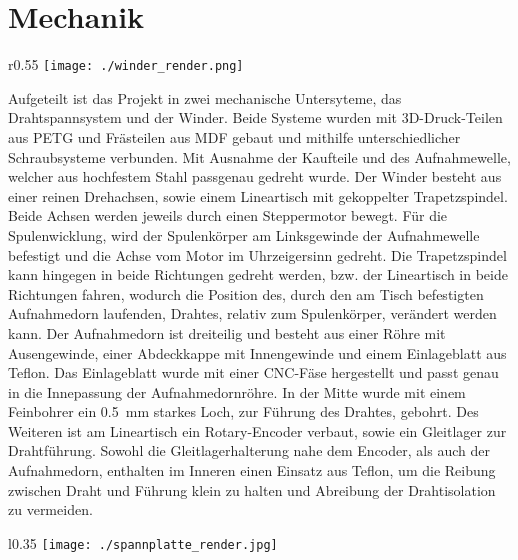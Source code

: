 \section{Mechanik}
\label{sec:Mechanik}




\begin{wrapfigure}{r}{0.55\textwidth}
    \centering
    \texttt{[image: ./winder\_render.png]}
\end{wrapfigure}

Aufgeteilt ist das Projekt in zwei mechanische Untersyteme, das Drahtspannsystem und der Winder.
Beide Systeme wurden mit 3D-Druck-Teilen aus PETG und Frästeilen aus MDF gebaut und mithilfe unterschiedlicher Schraubsysteme verbunden. Mit Ausnahme der Kaufteile und des Aufnahmewelle, welcher aus hochfestem Stahl passgenau gedreht wurde.
\newline
Der Winder besteht aus einer reinen Drehachsen, sowie einem Lineartisch mit gekoppelter Trapetzspindel. Beide Achsen werden jeweils durch einen Steppermotor bewegt. Für die Spulenwicklung, wird der Spulenkörper am Linksgewinde der Aufnahmewelle befestigt und die Achse vom Motor im Uhrzeigersinn gedreht. Die Trapetzspindel kann hingegen in beide Richtungen gedreht werden, bzw. der Lineartisch in beide Richtungen fahren, wodurch die Position des, durch den am Tisch befestigten Aufnahmedorn laufenden, Drahtes, relativ zum Spulenkörper, verändert werden kann. Der Aufnahmedorn ist dreiteilig und besteht aus einer Röhre mit Ausengewinde, einer Abdeckkappe mit Innengewinde und einem Einlageblatt aus Teflon. Das Einlageblatt wurde mit einer CNC-Fäse hergestellt und passt genau in die Innepassung der Aufnahmedornröhre. In der Mitte wurde mit einem Feinbohrer ein 0.5~\si{\milli\metre} starkes Loch, zur Führung des Drahtes, gebohrt.
Des Weiteren ist am Lineartisch ein Rotary-Encoder verbaut, sowie ein Gleitlager zur Drahtführung. Sowohl die Gleitlagerhalterung nahe dem Encoder, als auch der Aufnahmedorn, enthalten im Inneren einen Einsatz aus Teflon, um die Reibung zwischen Draht und Führung klein zu halten und Abreibung der Drahtisolation zu vermeiden. \newline
\begin{wrapfigure}{l}{0.35\textwidth}
    \centering
    \texttt{[image: ./spannplatte\_render.jpg]}
\end{wrapfigure}

